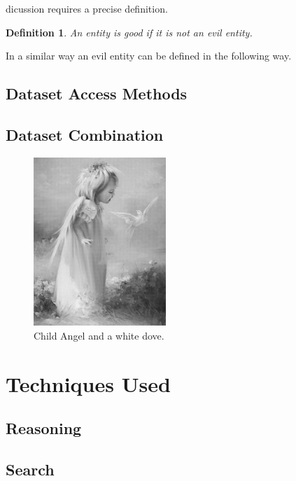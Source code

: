 \documentclass[11pt,titlepage,oneside,openany]{book}
\newtheorem{definition}{Definition}
\begin{document}
 dicussion requires a precise definition.
\begin{definition}
\label{def:good}
An entity is good if it is not an evil entity.
\end{definition}
In a similar way an evil entity can be defined in the following way.



\section{Dataset Access Methods}
\label{sec:dataaccess}


\section{Dataset Combination}
\label{sec:datacomb}


\begin{figure}
	\begin{center}
	\includegraphics[width=5cm]{good.png}
	\caption[Angel]{Child Angel and a white dove.}
	\label{fig:angel}
	\end{center}
\end{figure}



\chapter{Techniques Used}
\label{cha:technique}



\section{Reasoning}
\label{sec:reasoning}


\section{Search}
\label{sec:search}
\end{document}
